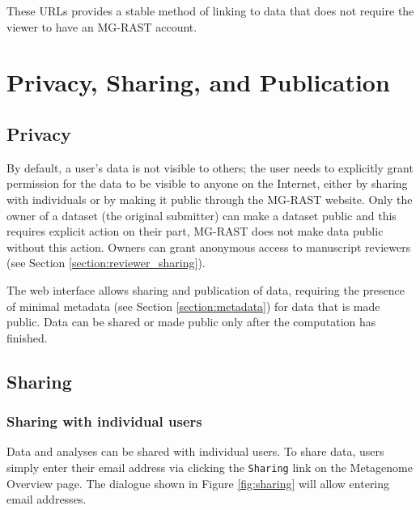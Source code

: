 \documentclass[12pt,fullpage]{report}
\begin{document}
These URLs provides a stable method of linking to data that does not require the viewer to have an MG-RAST account. 
\section{Privacy, Sharing, and Publication}
\subsection{Privacy}
By default, a user's data is not visible to others; the user needs to explicitly grant permission for the data to be visible to anyone on the Internet, either by sharing with individuals or by making it public through the MG-RAST website. Only the owner of a dataset (the original submitter) can make a dataset public and this requires explicit action on their part, MG-RAST does not make data public without this action.
Owners can grant anonymous access to manuscript reviewers  (see Section \ref{section:reviewer_sharing}).

The web interface allows sharing and publication of data, requiring the presence of minimal metadata
(see Section \ref{section:metadata}) for data that is made public. 
Data can be shared or made public only after the computation has finished.
\subsection{Sharing}
\subsubsection{Sharing with individual users}
\label{section:user_sharing}
Data and analyses can be shared with individual users. To share data, users simply enter their email address via clicking the \texttt{Sharing} link on the Metagenome Overview page. The dialogue shown in Figure \ref{fig:sharing} will allow entering email addresses.
\end{document}
